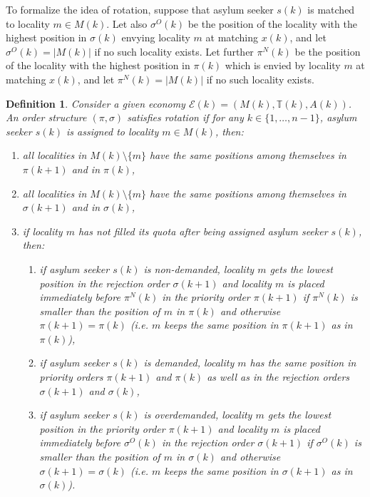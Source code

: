 \documentclass[12pt,fleqn]{article}
\newtheorem{definition}{Definition}
\begin{document}
To formalize the idea of rotation, suppose that asylum seeker $s(k)$ is matched to locality $m\in M(k)$. Let also $\sigma^O(k)$ be the position of the locality with the highest position in $\sigma(k)$ envying locality $m$ at matching $x(k)$, and let $\sigma^O(k)=|M(k)|$ if no such locality exists. Let further $\pi^N(k)$ be the position of the locality with the highest position in $\pi(k)$ which is envied by locality $m$ at matching $x(k)$, and let $\pi^N(k)=|M(k)|$ if no such locality exists.
\begin{definition}\rm\label{DEF:Rotation}
Consider a given economy $\mathcal{E}(k)=(M(k),\mathbb{T}(k),A(k))$. An order structure $(\pi,\sigma)$ satisfies rotation if for any $k\in\{1,\ldots,n-1\}$, asylum seeker $s(k)$ is assigned to locality $m\in M(k)$, then:
\begin{enumerate}
\item[(i)] all localities in $M(k)\setminus \{m\}$ have the same positions among themselves in $\pi(k+1)$ and in $\pi(k)$,

\item[(ii)] all localities in $M(k)\setminus \{m\}$ have the same positions among themselves in $\sigma(k+1)$ and in $\sigma(k)$,

\item[(iii)] if locality $m$ has not filled its quota after being assigned asylum seeker $s(k)$, then:
\begin{enumerate}
\item[(a)] if asylum seeker $s(k)$ is non-demanded, locality $m$ gets the lowest position in the rejection order $\sigma(k+1)$ and locality $m$ is placed immediately before $\pi^{N}(k)$ in the priority order $\pi(k+1)$ if $\pi^N(k)$ is smaller than the position of $m$ in $\pi(k)$ and otherwise $\pi(k+1)=\pi(k)$ (i.e. $m$ keeps the same position in $\pi(k+1)$ as in $\pi(k)$),
\item[(b)] if asylum seeker $s(k)$ is demanded, locality $m$ has the same position in priority orders $\pi(k+1)$ and $\pi(k)$ as well as in the rejection orders $\sigma(k+1)$ and $\sigma(k)$,
\item[(c)] if asylum seeker $s(k)$ is overdemanded, locality $m$ gets the lowest position in the priority order $\pi(k+1)$ and locality $m$ is placed immediately before $\sigma^{O}(k)$ in the rejection order $\sigma(k+1)$ if $\sigma^O(k)$ is smaller than the position of $m$ in $\sigma(k)$ and otherwise $\sigma(k+1)=\sigma(k)$ (i.e. $m$ keeps the same position in $\sigma(k+1)$ as in $\sigma(k)$).
\end{enumerate}
\end{enumerate}
\end{definition}
\end{document}
